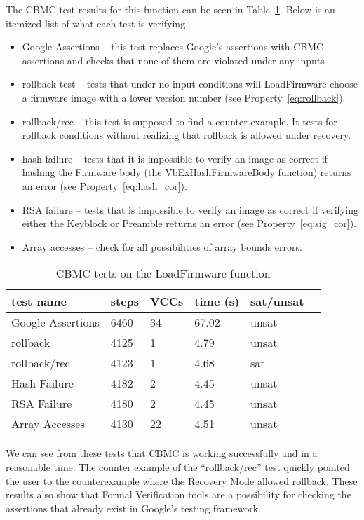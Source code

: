 The CBMC test results for this function can be seen in Table~\ref{ldfw_results}. 
Below is an itemized list of what each test is verifying.

\begin{itemize}
 \item  Google Assertions -- this test replaces Google's assertions with CBMC assertions and checks that none of them are violated under any inputs
 \item  rollback test -- tests that under no input conditions will LoadFirmware choose a firmware image with a lower version number (see Property~\ref{eq:rollback}).
 \item  rollback/rec  -- this test is supposed to find a counter-example. It tests for rollback conditions without realizing that rollback is allowed under recovery. 
 \item  hash failure -- tests that it is impossible to verify an image as correct  if hashing the Firmware body (the VbExHashFirmwareBody function) returns an error (see Property~\ref{eq:hash_cor}).
 \item  RSA failure -- tests that is impossible to verify an image as correct if verifying either the Keyblock or Preamble returns an error (see Property~\ref{eq:sig_cor}).
 \item  Array accesses -- check for all possibilities of array bounds errors.
\end{itemize}

\begin{table}[!htbp]
    \centering
    \caption{CBMC tests on the LoadFirmware function}\label{ldfw_results}
    \begin{tabular}{llllll}
        \toprule
        test name & steps & VCCs  & time (s) & sat/unsat  \\ \bottomrule
        Google Assertions & 6460 & 34 & 67.02 & unsat \\
        rollback     & 4125 & 1 & 4.79 & unsat \\
        rollback/rec & 4123 & 1 & 4.68 & sat \\
        Hash Failure & 4182 & 2 & 4.45 & unsat \\
        RSA  Failure & 4180 & 2 & 4.45 & unsat \\
        Array Accesses & 4130 & 22 & 4.51 & unsat \\
    \end{tabular}
\end{table}

We can see from these tests that CBMC is working successfully and in a reasonable time.
The counter example of the ``rollback/rec'' test quickly pointed the user to the counterexample where the Recovery Mode allowed rollback.
These results also show that Formal Verification tools are a possibility for checking the assertions that already exist in Google's testing framework.

